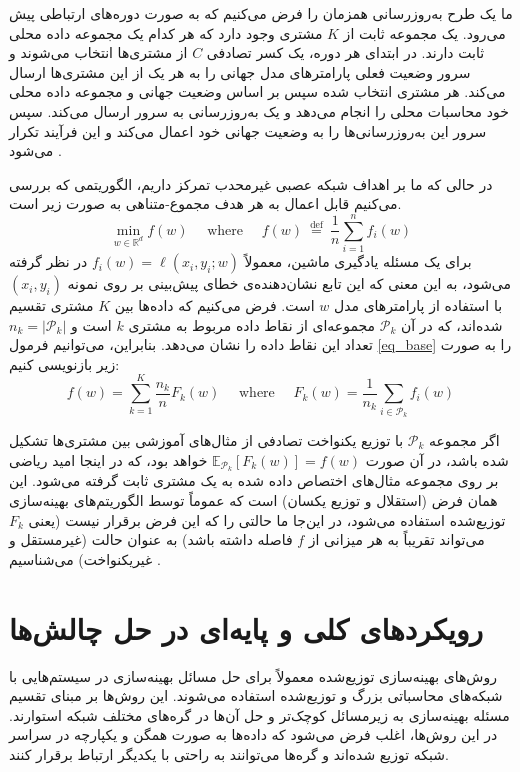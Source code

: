 ما یک طرح به‌روزرسانی همزمان را فرض می‌کنیم که به صورت دوره‌های ارتباطی پیش می‌رود. یک مجموعه ثابت از
$K$
مشتری وجود دارد که هر کدام یک مجموعه داده محلی ثابت دارند. در ابتدای هر دوره، یک کسر تصادفی
$C$
از مشتری‌ها انتخاب می‌شوند و سرور وضعیت فعلی پارامترهای مدل جهانی را به هر یک از این مشتری‌ها ارسال می‌کند. هر مشتری انتخاب ‌شده سپس بر اساس وضعیت جهانی و مجموعه داده محلی خود محاسبات محلی را انجام می‌دهد و یک به‌روزرسانی به سرور ارسال می‌کند. سپس سرور این به‌روزرسانی‌ها را به وضعیت جهانی خود اعمال می‌کند و این فرآیند تکرار می‌شود
\cite{mcmahan2017communication}.

در حالی که ما بر اهداف شبکه عصبی غیرمحدب
تمرکز داریم، الگوریتمی که بررسی می‌کنیم قابل اعمال به هر هدف مجموع-متناهی
به صورت زیر است.
\begin{equation}
\min _{w \in \mathbb{R}^d} f(w) \quad \text { where } \quad f(w) \stackrel{\text { def }}{=} \frac{1}{n} \sum_{i=1}^n f_i(w)
\label{eq_base}
\end{equation}
برای یک مسئله یادگیری ماشین، معمولاً
$f_i(w)=\ell\left(x_i, y_i ; w\right)$
در نظر گرفته می‌شود، به این معنی که این تابع نشان‌دهنده‌ی خطای پیش‌بینی بر روی نمونه
$(x_i, y_i)$
با استفاده از پارامترهای مدل
$w$
است. فرض می‌کنیم که داده‌ها بین
$K$
مشتری تقسیم شده‌اند، که در آن
$\mathcal{P}_k$
مجموعه‌ای از نقاط داده مربوط به مشتری
$k$
است و
$n_k=\left|\mathcal{P}_k\right|$
تعداد این نقاط داده را نشان می‌دهد. بنابراین، می‌توانیم فرمول
\ref{eq_base}
را به صورت زیر بازنویسی کنیم:
\begin{equation}
f(w)=\sum_{k=1}^K \frac{n_k}{n} F_k(w) \quad \text { where } \quad F_k(w)=\frac{1}{n_k} \sum_{i \in \mathcal{P}_k} f_i(w)
\end{equation}

اگر مجموعه
$\mathcal{P}_k$
با توزیع یکنواخت تصادفی از مثال‌های آموزشی بین مشتری‌ها تشکیل شده باشد، در آن صورت
$\mathbb{E}_{\mathcal{P}_k}\left[F_k(w)\right]=f(w)$ 
خواهد بود، که در اینجا امید ریاضی بر روی مجموعه مثال‌های اختصاص داده شده به یک مشتری ثابت گرفته می‌شود. این همان فرض
(استقلال و توزیع یکسان)
است که عموماً توسط الگوریتم‌های بهینه‌سازی توزیع‌شده استفاده می‌شود، در این‌جا ما حالتی را که این فرض برقرار نیست (یعنی
$F_k$
می‌تواند تقریباً به هر میزانی از
$f$
فاصله داشته باشد) به عنوان حالت
(غیرمستقل و غیریکنواخت)
می‌شناسیم
\cite{mcmahan2017communication}.


\section{رویکردهای کلی و پایه‌ای در حل چالش‌ها}
روش‌های بهینه‌سازی توزیع‌شده معمولاً برای حل مسائل بهینه‌سازی در سیستم‌هایی با شبکه‌های محاسباتی بزرگ و توزیع‌شده استفاده می‌شوند. این روش‌ها بر مبنای تقسیم مسئله بهینه‌سازی به زیرمسائل کوچک‌تر و حل آن‌ها در گره‌های مختلف شبکه استوارند. در این روش‌ها، اغلب فرض می‌شود که داده‌ها به صورت همگن و یکپارچه در سراسر شبکه توزیع شده‌اند و گره‌ها می‌توانند به راحتی با یکدیگر ارتباط برقرار کنند.

